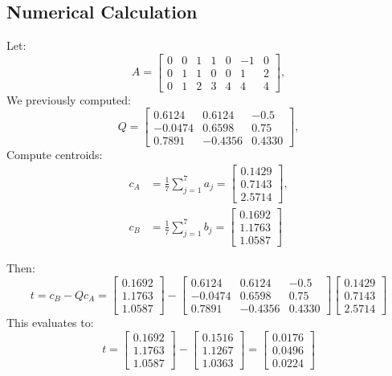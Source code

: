 \documentclass[12pt]{article}
\begin{document}
\subsection*{Numerical Calculation}
Let:
\[
A = \begin{bmatrix} 0 & 0 & 1 & 1 & 0 & -1 & 0 \\ 0 & 1 & 1 & 0 & 0 & 1 & 2 \\ 0 & 1 & 2 & 3 & 4 & 4 & 4 \end{bmatrix},
\]
We previously computed:
\[
Q = \begin{bmatrix} 0.6124 & 0.6124 & -0.5 \\ -0.0474 & 0.6598 & 0.75 \\ 0.7891 & -0.4356 & 0.4330 \end{bmatrix},
\]
Compute centroids:
\begin{align*}
c_A &= \frac{1}{7} \sum_{j=1}^7 a_j = \begin{bmatrix} 0.1429 \\ 0.7143 \\ 2.5714 \end{bmatrix}, \\
c_B &= \frac{1}{7} \sum_{j=1}^7 b_j = \begin{bmatrix} 0.1692 \\ 1.1763 \\ 1.0587 \end{bmatrix}
\end{align*}

Then:
\[
t = c_B - Q c_A = \begin{bmatrix} 0.1692 \\ 1.1763 \\ 1.0587 \end{bmatrix} - \begin{bmatrix} 0.6124 & 0.6124 & -0.5 \\ -0.0474 & 0.6598 & 0.75 \\ 0.7891 & -0.4356 & 0.4330 \end{bmatrix} \begin{bmatrix} 0.1429 \\ 0.7143 \\ 2.5714 \end{bmatrix}
\]
This evaluates to:
\[
t = \begin{bmatrix} 0.1692 \\ 1.1763 \\ 1.0587 \end{bmatrix} - \begin{bmatrix} 0.1516 \\ 1.1267 \\ 1.0363 \end{bmatrix} = \begin{bmatrix} 0.0176 \\ 0.0496 \\ 0.0224 \end{bmatrix}
\]
\end{document}
